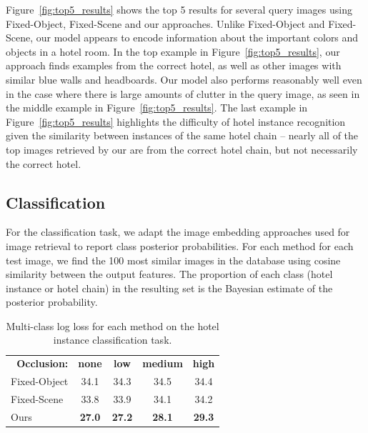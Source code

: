 Figure~\ref{fig:top5_results} shows the top 5 results for several query images using {\sc Fixed-Object}, {\sc Fixed-Scene} and our approaches.  Unlike {\sc Fixed-Object} and {\sc Fixed-Scene}, our model appears to encode information about the important colors and objects in a hotel room. In the top example in Figure~\ref{fig:top5_results}, our approach finds examples from the correct hotel, as well as other images with similar blue walls and headboards. Our model also performs reasonably well even in the case where there is large amounts of clutter in the query image, as seen in the middle example in Figure~\ref{fig:top5_results}. The last example in Figure~\ref{fig:top5_results} highlights the difficulty of hotel instance recognition given the similarity between instances of the same hotel chain -- nearly all of the top images retrieved by our are from the correct hotel chain, but
not necessarily the correct hotel. 

\subsection{Classification}
For the classification task, we adapt the image
embedding approaches used for image retrieval to report class posterior probabilities. For each method for each test image, 
we find the 100 most similar images in the database 
using cosine similarity between the output features. The proportion of each class (hotel instance or hotel chain)
in the resulting set is the Bayesian estimate of the posterior probability.


\begin{table}
    \def\arraystretch{1.1}
    \centering
    \begin{tabular}{c|c|c|c|c|}
        \multicolumn{1}{r}{\textbf{Occlusion:}} & \multicolumn{1}{c}{\textbf{none}} & \multicolumn{1}{c}{\textbf{low}} & \multicolumn{1}{c}{\textbf{medium}} & \multicolumn{1}{c}{\textbf{high}} \\
        \cline{1-5}
        \multicolumn{1}{|l|}{{\sc Fixed-Object}} & 34.1 & 34.3 & 34.5 & 34.4 \\
        \multicolumn{1}{|l|}{{\sc Fixed-Scene}} & 33.8 & 33.9 & 34.1 & 34.2 \\
        \multicolumn{1}{|l|}{Ours} & \textbf{27.0} & \textbf{27.2}  & \textbf{28.1} & \textbf{29.3} \\
        \cline{1-5}
    \end{tabular}
    \caption{Multi-class log loss for
    each method on the hotel instance classification task. }
    \label{tab:log_loss}
\end{table}

